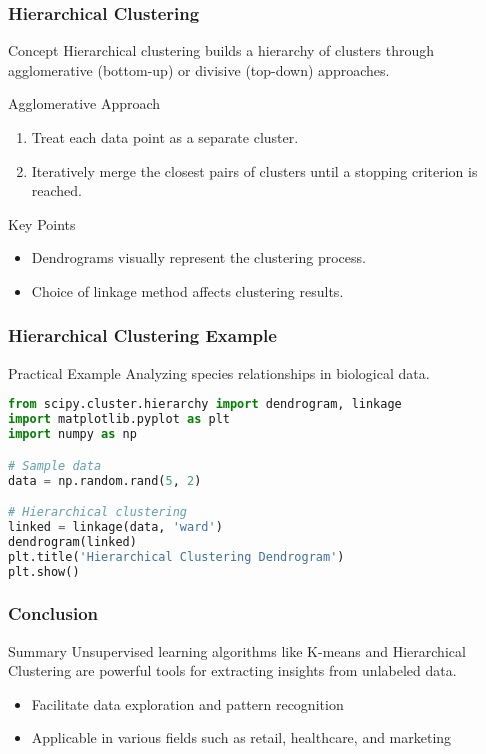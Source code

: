 \documentclass[aspectratio=169]{beamer}
\begin{document}
\begin{frame}
    \frametitle{Hierarchical Clustering}
    \begin{block}{Concept}
        Hierarchical clustering builds a hierarchy of clusters through agglomerative (bottom-up) or divisive (top-down) approaches.
    \end{block}
    
    \begin{block}{Agglomerative Approach}
        \begin{enumerate}
            \item Treat each data point as a separate cluster.
            \item Iteratively merge the closest pairs of clusters until a stopping criterion is reached.
        \end{enumerate}
    \end{block}
    
    \begin{block}{Key Points}
        \begin{itemize}
            \item Dendrograms visually represent the clustering process.
            \item Choice of linkage method affects clustering results.
        \end{itemize}
    \end{block}
\end{frame}

\begin{frame}[fragile]
    \frametitle{Hierarchical Clustering Example}
    \begin{block}{Practical Example}
        Analyzing species relationships in biological data.
    \end{block}
    
    \begin{lstlisting}[language=Python]
from scipy.cluster.hierarchy import dendrogram, linkage
import matplotlib.pyplot as plt
import numpy as np

# Sample data
data = np.random.rand(5, 2)

# Hierarchical clustering
linked = linkage(data, 'ward')
dendrogram(linked)
plt.title('Hierarchical Clustering Dendrogram')
plt.show()
    \end{lstlisting}
\end{frame}

\begin{frame}
    \frametitle{Conclusion}
    \begin{block}{Summary}
        Unsupervised learning algorithms like K-means and Hierarchical Clustering are powerful tools for extracting insights from unlabeled data.
    \end{block}
    \begin{itemize}
        \item Facilitate data exploration and pattern recognition
        \item Applicable in various fields such as retail, healthcare, and marketing
    \end{itemize}
\end{frame}
\end{document}
